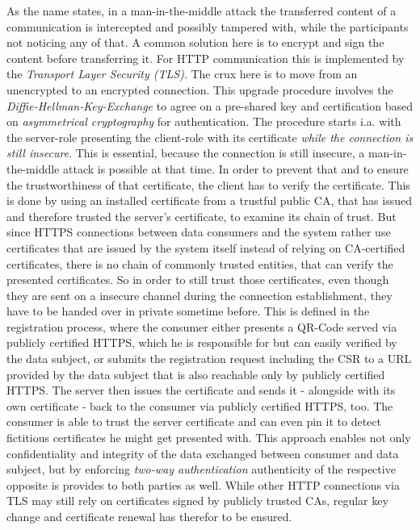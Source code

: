 \documentclass[12pt,english,a4paper,titlepage,cleardoublepage=empty,dottedtoc]{report}
\begin{document}
As the name states, in a man-in-the-middle attack the transferred
content of a communication is intercepted and possibly tampered with,
while the participants not noticing any of that. A common solution here
is to encrypt and sign the content before transferring it. For HTTP
communication this is implemented by the \emph{Transport Layer Security
(TLS)}. The crux here is to move from an unencrypted to an encrypted
connection. This upgrade procedure involves the
\emph{Diffie-Hellman-Key-Exchange} to agree on a pre-shared key and
certification based on \emph{asymmetrical cryptography} for
authentication. The procedure starts i.a. with the server-role
presenting the client-role with its certificate \emph{while the
connection is still insecure}. This is essential, because the connection
is still insecure, a man-in-the-middle attack is possible at that time.
In order to prevent that and to ensure the trustworthiness of that
certificate, the client has to verify the certificate. This is done by
using an installed certificate from a trustful public CA, that has
issued and therefore trusted the server's certificate, to examine its
chain of trust. But since HTTPS connections between data consumers and
the system rather use certificates that are issued by the system itself
instead of relying on CA-certified certificates, there is no chain of
commonly trusted entities, that can verify the presented certificates.
So in order to still trust those certificates, even though they are sent
on a insecure channel during the connection establishment, they have to
be handed over in private sometime before. This is defined in the
registration process, where the consumer either presents a QR-Code
served via publicly certified HTTPS, which he is responsible for but can
easily verified by the data subject, or submits the registration request
including the CSR to a URL provided by the data subject that is also
reachable only by publicly certified HTTPS. The server then issues the
certificate and sends it - alongside with its own certificate - back to
the consumer via publicly certified HTTPS, too. The consumer is able to
trust the server certificate and can even pin it to detect fictitious
certificates he might get presented with. This approach enables not only
confidentiality and integrity of the data exchanged between consumer and
data subject, but by enforcing \emph{two-way authentication}
authenticity of the respective opposite is provides to both parties as
well. While other HTTP connections via TLS may still rely on
certificates signed by publicly trusted CAs, regular key change and
certificate renewal has therefor to be ensured.
\end{document}
